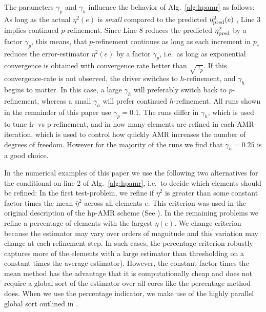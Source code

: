   The parameters $\gamma_p$ and $\gamma_h$
      influence the behavior of Alg.~\ref{alg:hpamr} as follows: As
      long as the actual $\eta^2(e)$ is \textit{small} compared to the
      predicted $\eta^2_{\rm pred}(e)$ , Line 3 implies continued
      $p$-refinement.  Since Line 8 reduces the predicted $\eta^2_{\rm
        pred}$ by a factor $\gamma_p$, this means, that $p$-refinement
      continues as long as each increment in $p_e$ reduces the
      error-estimator $\eta^2(e)$ by a factor $\gamma_p$, i.e.\ as
      long as exponential convergence is obtained with convergence
      rate better than $\sqrt{\gamma_p}$.  If this convergence-rate is
      not observed, the driver switches to $h$-refinement, and
      $\gamma_h$ begins to matter.  In this case, a large $\gamma_h$
      will preferably switch back to $p$-refinement, whereas a small
      $\gamma_h$ will prefer continued $h$-refinement.  All runs shown
      in the remainder of this paper use $\gamma_p=0.1$.  The runs
      differ in $\gamma_h$, which is used to tune h- vs p-refinement,
      and in how many elements are refined in each AMR-iteration,
      which is used to control how quickly AMR increases the number of
      degrees of freedom. However for the majority of the runs we find that $\gamma_h=0.25$ is a good choice.
  
In the numerical examples of this paper we use the
  following two alternatives for the conditional on line 2 of
  Alg.~\ref{alg:hpamr}, i.e.\ to decide which elements should be
  refined: In the first test-problem, we refine if $\eta^2$ is
greater than some constant factor times the mean $\bar \eta^2$ across all elements $e$. This criterion was used in the original description of the hp-AMR scheme (See \cite{melenk2001residual}).  In
the remaining problems we refine a percentage of elements with the largest $\eta(e)$. We change criterion because the estimator may vary over orders of magnitude and this variation may change at each refinement step. In such cases, the percentage criterion robustly captures more of the elements with a large estimator than thresholding on a constant times the average estimator). However, the constant factor times the
mean method has the advantage that it is computationally cheap and
does not require a global sort of the estimator over all cores like the
percentage method does. When we use the percentage indicator, we make use of the highly parallel global sort outlined in \cite{feng2015mp}.

